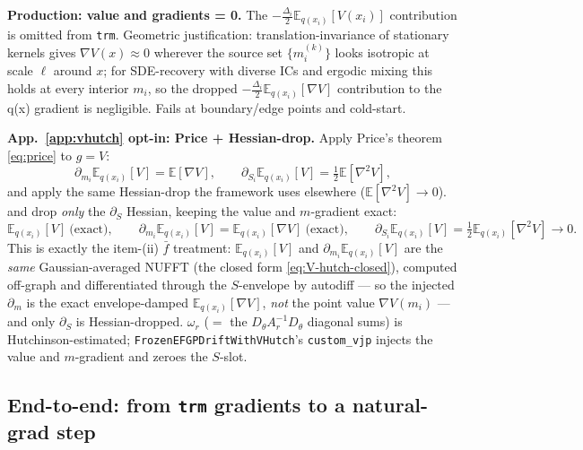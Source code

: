 \documentclass[11pt]{article}
\newcommand{\E}{\mathbb{E}}
\newcommand{\Eqx}{\mathbb{E}_{q(x_i)}}
\newcommand{\code}[1]{\texttt{\small #1}}
\begin{document}
\textbf{Production: value and gradients = 0.} The
$-\tfrac{\Delta_i}{2}\Eqx[V(x_i)]$ contribution is omitted from
\code{trm}. Geometric justification: translation-invariance of
stationary kernels gives $\nabla V(x) \approx 0$ wherever the source
set $\{m_i^{(k)}\}$ looks isotropic at scale $\ell$ around $x$; for
SDE-recovery with diverse ICs and ergodic mixing this holds at every
interior $m_i$, so the dropped $-\tfrac{\Delta_i}{2}\Eqx[\nabla V]$
contribution to the q(x) gradient is negligible. Fails at
boundary/edge points and cold-start.

\textbf{App.~\ref{app:vhutch} opt-in: Price + Hessian-drop.} Apply
Price's theorem \eqref{eq:price} to $g = V$:
\begin{equation}
\partial_{m_i}\Eqx[V] = \E[\nabla V],\qquad
\partial_{S_i}\Eqx[V] = \tfrac{1}{2}\E[\nabla^2 V],
\end{equation}
and apply the same Hessian-drop the framework uses elsewhere
($\E[\nabla^2 V] \to 0$). and drop \emph{only} the $\partial_S$ Hessian, keeping the value and
$m$-gradient exact:
\begin{equation}
\Eqx[V]\ \text{(exact)},\qquad
\partial_{m_i}\Eqx[V] = \Eqx[\nabla V]\ \text{(exact)},\qquad
\partial_{S_i}\Eqx[V] = \tfrac12\Eqx[\nabla^2 V]\to 0.
\label{eq:V-grads-taylor}
\end{equation}
This is exactly the item-(ii) $\bar f$ treatment: $\Eqx[V]$ and
$\partial_{m_i}\Eqx[V]$ are the \emph{same} Gaussian-averaged NUFFT (the
closed form \eqref{eq:V-hutch-closed}), computed off-graph and
differentiated through the $S$-envelope by autodiff --- so the injected
$\partial_m$ is the exact envelope-damped $\Eqx[\nabla V]$, \emph{not} the
point value $\nabla V(m_i)$ --- and only $\partial_S$ is Hessian-dropped.
$\omega_r$ ($=$ the $D_\theta A_r^{-1}D_\theta$ diagonal sums) is
Hutchinson-estimated; \code{FrozenEFGPDriftWithVHutch}'s
\code{custom\_vjp} injects the value and $m$-gradient and zeroes the
$S$-slot.

\subsection*{End-to-end: from \code{trm} gradients to a natural-grad step}
\end{document}
